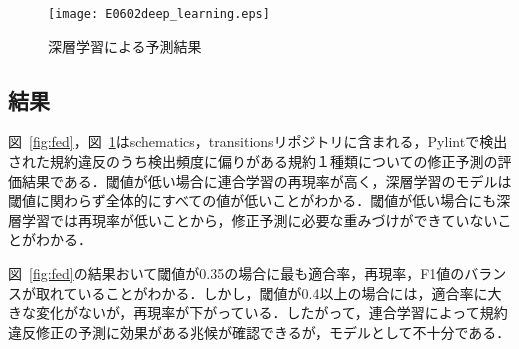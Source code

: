 \documentclass[uplatex,dvipdfmx,a4paper,twocolumn,base=11pt,jbase=11pt,ja=standard]{bxjsarticle}  %
\begin{document}
\begin{figure}
\begin{center}
\texttt{[image: E0602deep\_learning.eps]}
\caption{深層学習による予測結果}
\label{fig:deep}
\end{center}
\end{figure}






\subsection{結果}
図~\ref{fig:fed}，図~\ref{fig:deep}はschematics，transitionsリポジトリに含まれる，Pylintで検出された規約違反のうち検出頻度に偏りがある規約１種類についての修正予測の評価結果である．閾値が低い場合に連合学習の再現率が高く，深層学習のモデルは閾値に関わらず全体的にすべての値が低いことがわかる．閾値が低い場合にも深層学習では再現率が低いことから，修正予測に必要な重みづけができていないことがわかる．

図~\ref{fig:fed}の結果おいて閾値が0.35の場合に最も適合率，再現率，F1値のバランスが取れていることがわかる．しかし，閾値が0.4以上の場合には，適合率に大きな変化がないが，再現率が下がっている．したがって，連合学習によって規約違反修正の予測に効果がある兆候が確認できるが，モデルとして不十分である．

\end{document}
